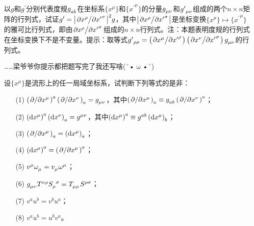 \begin{xiti}
    \item 以$g$和$g^\prime$分别代表度规$\tensor{g}{_{ab}}$在坐标系$\{x^\mu\}$和$\{{x^\prime}^\mu\}$的分量$\tensor{g}{_{\mu\nu}}$和$\tensor{{g^\prime}}{_{\mu\nu}}$组成的两个$n\times n$矩阵的行列式，试证$g^\prime=\abs{\pdv*{x^\rho}{{x^\prime}^\sigma}}^2 g$，其中$\abs{\pdv*{x^\rho}{{x^\prime}^\sigma}}$是坐标变换$\{x^\mu\}\mapsto \{{x^\prime}^\mu \} $的雅可比行列式，即由$\pdv*{x^\rho}{{x^\prime}^\sigma} $组成的$n\times n$行列式。注：本题表明度规的行列式在坐标变换下不是不变量。提示：取等式$\tensor{{g^\prime}}{_{\rho\sigma}}=\left( \pdv*{x^\mu}{{x^\prime}^\rho}\right)\left(\pdv*{x^\nu}{{x^\prime}^\sigma} \right)\tensor{g}{_{\mu\nu}}  $的行列式。
    
    \begin{zm}
    	……梁爷爷你提示都把题写完了我还写啥(˘•$\upomega$•˘)
    \end{zm}
    
    \item 设$\{x^\mu \}$是流形上的任一局域坐标系，试判断下列等式的是非：
    \begin{enumerate}
    	\item[(1)] $\left(\pd{x^\mu} \right)^a\tensor{\left(\pd{x^\nu} \right)}{_a}=\tensor{g}{_\mu_\nu} $，其中$\tensor{\left(\pd{x^\mu} \right)}{_a} \equiv \tensor{g}{_a_b}\left(\pd{x^\nu} \right)^a $；
    	\item[(2)] $\left(\dd{x^\mu}\right)^a\tensor{\left(\dd{x^\nu}\right)}{_a}=\tensor{g}{^\mu^\nu} $，其中$\left(\dd{x^\mu}\right)^a\equiv \tensor{g}{^a^b}\tensor{\left(\dd{x^\mu} \right)}{_b} $；
    	\item[(3)] \hypertarget{2.23.3}{}$\tensor{\left(\pd{x^\mu}\right)}{_a}=\tensor{\left(\dd{x^\mu} \right)}{_a} $；
    	\item[(4)] $\left(\dd{x^\mu} \right)^a=\tensor{{\left(\pd{x^\mu} \right)}}{^a} $；
    	\item[(5)] $v^\mu\tensor{\omega}{_\mu}=\tensor{v}{_\mu}\omega^\mu $；
    	\item[(6)] $\tensor{g}{_\mu_\nu}\tensor{T}{^\nu^\rho}\tensor{S}{_\rho^\sigma}=\tensor{T}{_\mu_\rho}\tensor{S}{^\rho^\sigma} $；
    	\item[(7)] $v^au^b=v^bu^a$；
    	\item[(8)] $v^au^b=u^bv^a$。
    \end{enumerate}
    

\end{xiti}
